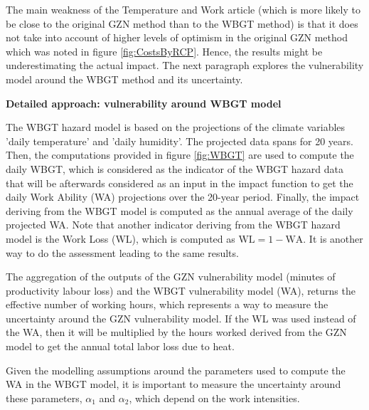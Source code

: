 The main weakness of the Temperature and Work article (which is more likely to be close to the original GZN method than to the WBGT method) is that it does not take into account of higher levels of optimism in the original GZN method which was noted in figure \ref{fig:CostsByRCP}. Hence, the results might be underestimating the actual impact. The next paragraph explores the vulnerability model around the WBGT method and its uncertainty.

\textbf{Detailed approach: vulnerability around WBGT model}

The WBGT hazard model is based on the projections of the climate variables 'daily temperature' and 'daily humidity'. The projected data spans for 20 years. Then, the computations provided in figure \ref{fig:WBGT} are used to compute the daily WBGT, which is considered as the indicator of the WBGT hazard data that will be afterwards considered as an input in the impact function to get the daily Work Ability (WA) projections over the 20-year period. Finally, the impact deriving from the WBGT model is computed as the annual average of the daily projected WA.
Note that another indicator deriving from the WBGT hazard model is the Work Loss (WL), which is computed as $\text{WL} = 1 - \text{WA}$. It is another way to do the assessment leading to the same results.

The aggregation of the outputs of the GZN vulnerability model (minutes of productivity labour loss) and the WBGT vulnerability model (WA), returns the effective number of working hours, which represents a way to measure the uncertainty around the GZN vulnerability model. %
If the WL was used instead of the WA, then it will be multiplied by the hours worked derived from the GZN model to get the annual total labor loss due to heat.

Given the modelling assumptions around the parameters used to compute the WA in the WBGT model, it is important to measure the uncertainty around these parameters, $\alpha_1$ and $\alpha_2$, which depend on the work intensities.

